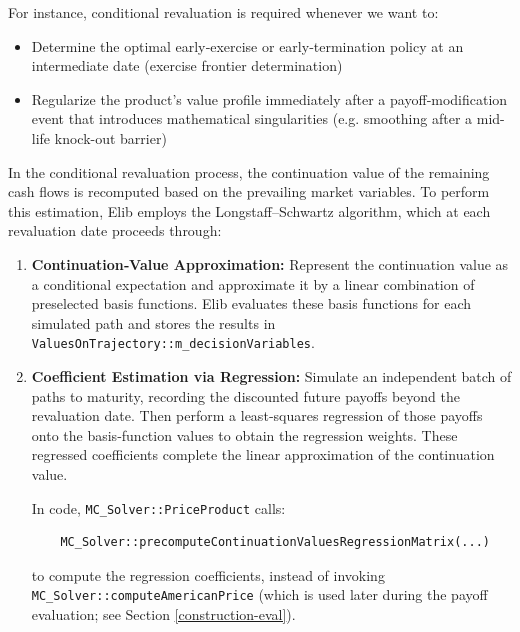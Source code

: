 \documentclass[11pt]{article}
\begin{document}
For instance, conditional revaluation is required whenever we want to:
\begin{itemize}
    \item Determine the optimal early‐exercise or early‐termination policy at an intermediate date (exercise frontier determination)
    \item Regularize the product’s value profile immediately after a payoff‐modification event that introduces mathematical singularities (e.g. smoothing after a mid-life knock-out barrier) 
\end{itemize}

In the conditional revaluation process, the continuation value of the remaining cash flows is recomputed based on the prevailing market variables. To perform this estimation, Elib employs the Longstaff–Schwartz algorithm, which at each revaluation date proceeds through:

\begin{enumerate}
  \item \textbf{Continuation‐Value Approximation:}  
    Represent the continuation value as a conditional expectation and approximate it by a linear combination of preselected basis functions.  Elib evaluates these basis functions for each simulated path and stores the results in \newline \texttt{ValuesOnTrajectory::m\_decisionVariables}.

  \item \textbf{Coefficient Estimation via Regression:}  
    Simulate an independent batch of paths to maturity, recording the discounted future payoffs beyond the revaluation date.  Then perform a least‐squares regression of those payoffs onto the basis‐function values to obtain the regression weights.  These regressed coefficients complete the linear approximation of the continuation value.

    In code, \texttt{MC\_Solver::PriceProduct} calls:
    \begin{verbatim}
    MC_Solver::precomputeContinuationValuesRegressionMatrix(...)
    \end{verbatim}
    to compute the regression coefficients, instead of invoking \texttt{MC\_Solver::computeAmericanPrice} (which is used later during the payoff evaluation; see Section \ref{construction-eval}).
\end{enumerate}
\end{document}
